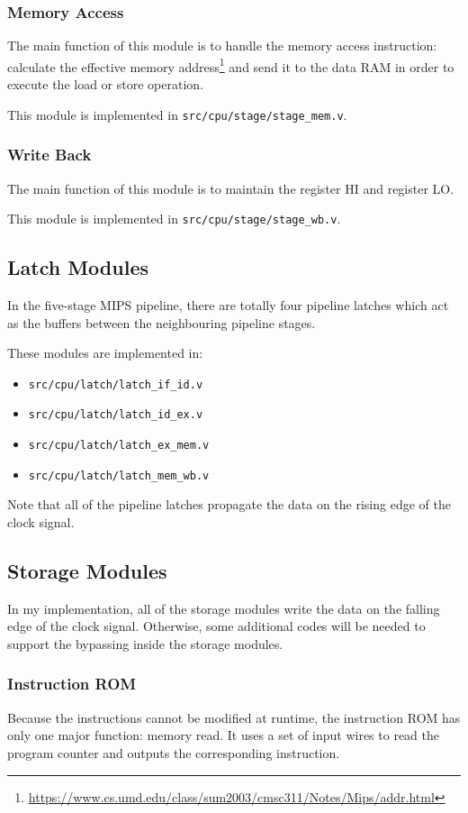 \documentclass{article}
\begin{document}
\newpage
\subsubsection{Memory Access}
The main function of this module is to handle the memory access instruction: calculate the effective memory address\footnote{\url{https://www.cs.umd.edu/class/sum2003/cmsc311/Notes/Mips/addr.html}} and send it to the data RAM in order to execute the load or store operation.


This module is implemented in \texttt{src/cpu/stage/stage\_mem.v}.

\newpage
\subsubsection{Write Back}
The main function of this module is to maintain the register HI and register LO.


This module is implemented in \texttt{src/cpu/stage/stage\_wb.v}.

\subsection{Latch Modules}
In the five-stage MIPS pipeline, there are totally four pipeline latches which act as the buffers between the neighbouring pipeline stages. 

These modules are implemented in:
\begin{itemize}
\item
\texttt{src/cpu/latch/latch\_if\_id.v}
\item
\texttt{src/cpu/latch/latch\_id\_ex.v}
\item
\texttt{src/cpu/latch/latch\_ex\_mem.v}
\item
\texttt{src/cpu/latch/latch\_mem\_wb.v}
\end{itemize}
Note that all of the pipeline latches propagate the data on the rising edge of the clock signal.

\subsection{Storage Modules}
In my implementation, all of the storage modules write the data on the falling edge of the clock signal. Otherwise, some additional codes will be needed to support the bypassing inside the storage modules.

\subsubsection{Instruction ROM}
Because the instructions cannot be modified at runtime, the instruction ROM has only one major function: memory read. It uses a set of input wires to read the program counter and outputs the corresponding instruction.
\end{document}
